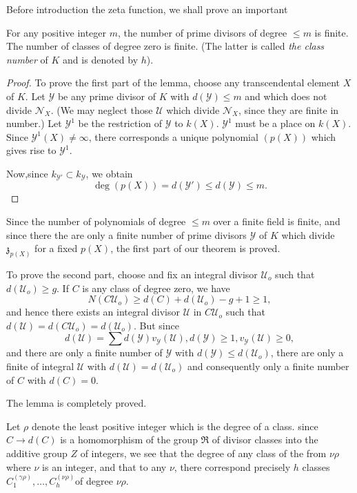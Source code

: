 Before introduction the zeta function, we shall prove an important
\begin{lemma*}
  For any positive integer $m$, the number of prime divisors of degree
  $\le m$ is finite. The number of classes of degree zero is
  finite. (The latter is called {\em the class number} of $K$ and is
  denoted by $h$).  
\end{lemma*}

\begin{proof}
  To prove the first part of the lemma, choose any transcendental
  element $X$ of $K$. Let $\mathscr{Y}$ be any prime divisor of $K$
  with $d (\mathscr{Y}) \le m$ and which does not divide
  $\mathscr{N}_X$. (We may neglect those $\mathscr{U}$ which divide
  $\mathscr{N}_X$, since they are finite in number.) Let
  $\mathscr{Y}^1$ be the restriction of $\mathscr{Y}$ to $k
  (X)$. $\mathscr{Y}^1$ must be a place on $k (X)$. Since
  $\mathscr{Y}^1 (X) \neq \infty$, there corresponds a unique
  polynomial $(p(X))$ which gives rise to $\mathscr{Y}^1$.  

  Now,\pageoriginale since $k_{\mathscr{Y}'} \subset k_\mathscr{Y}$, we obtain
  $$
  \deg (p (X)) = d (\mathscr{Y'}) \le d (\mathscr{Y}) \le m.
  $$
\end{proof}

Since the number of polynomials of degree $\le m$ over a finite field
is finite, and since there the are only a finite number of prime
divisors $\mathscr{Y}$ of $K$ which divide $\mathfrak{z}_{p
  ({X})}$ for a fixed $p (X)$, the first part of our theorem
is proved.  

To prove the second part, choose and fix an integral divisor
$\mathscr{U}_o$ such that $d (\mathscr{U}_o) \ge g$. If $C$ is any
class of degree zero, we have  
$$
N (C \mathscr{U}_o ) \ge d (C) + d (\mathscr{U}_o) - g+1 \ge 1,
$$
and hence there exists an integral divisor $\mathscr{U}$ in $C
\mathscr{U}_o$ such that $d (\mathscr{U}) = d (C\mathscr{U}_o) = d
(\mathscr{U}_o)$. But since 
$$
d (\mathscr{U}) = \sum d (\mathscr{Y}) v_\mathscr{Y} (\mathscr{U}), d
(\mathscr{Y}) \ge 1, v_\mathscr{Y} (\mathscr{U}) \ge 0,  
$$
and there are only a finite number of $\mathscr{Y}$ with $d
(\mathscr{Y}) \le d (\mathscr{U}_o)$, there are only a finite of
integral $\mathscr{U}$ with $d (\mathscr{U}) = d (\mathscr{U}_o)$ and
consequently only a finite number of $C$ with $d (C) = 0$.  

The lemma is completely proved. 

\begin{remark}\label{chap10:sec21:rem1}%
  Let $\rho$ denote the least positive integer which is the degree of
  a class. since $C \to d (C)$ is a homomorphism of the group
  $\mathfrak{R}$ of divisor classes into the additive group $Z$ of
  integers, we see that the degree of any class of the from $\nu \rho$
  where $\nu$ is an integer, and that to any $\nu$, there correspond
  precisely $h$ classes $ C_1^{(\gamma \rho)} ,\ldots,C_h ^{(\nu
    \rho)}$\pageoriginale  of degree $\nu \rho$.  
\end{remark}

